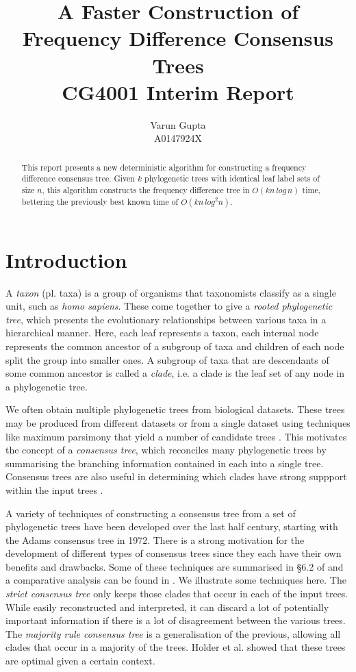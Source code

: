 \documentclass{article}
\title{A Faster Construction of Frequency Difference Consensus Trees\\CG4001 Interim Report}
\author{Varun Gupta\\A0147924X}
\begin{document}
    \maketitle

    \begin{abstract}
        This report presents a new deterministic algorithm for constructing a frequency difference consensus tree. Given $k$ phylogenetic trees with identical leaf label sets of size $n$, this algorithm constructs the frequency difference tree in $O(kn\,log\,n)$ time, bettering the previously best known time of $O(kn\,log^2n)$.
    \end{abstract}

    \section{Introduction}
    \label{sec:introduction}

    A \textit{taxon} (pl. taxa) is a group of organisms that taxonomists classify as a single unit, such as \textit{homo sapiens}. These come together to give a \textit{rooted phylogenetic tree}, which presents the evolutionary relationships between various taxa in a hierarchical manner. Here, each leaf represents a taxon, each internal node represents the common ancestor of a subgroup of taxa and children of each node split the group into smaller ones. A subgroup of taxa that are descendants of some common ancestor is called a \textit{clade}, i.e. a clade is the leaf set of any node in a phylogenetic tree.

    We often obtain multiple phylogenetic trees from biological datasets. These trees may be produced from different datasets or from a single dataset using techniques like maximum parsimony that yield a number of candidate trees \cite{bryant1997hunting}. This motivates the concept of a \textit{consensus tree}, which reconciles many phylogenetic trees by summarising the branching information contained in each into a single tree. Consensus trees are also useful in determining which clades have strong suppport within the input trees \cite{felsenstein2004inferring}.

    A variety of techniques of constructing a consensus tree from a set of phylogenetic trees have been developed over the last half century, starting with the Adams consensus tree \cite{adams1972consensus} in 1972. There is a strong motivation for the development of different types of consensus trees since they each have their own benefits and drawbacks. Some of these techniques are summarised in \S 6.2 of \cite{bryant1997hunting} and a comparative analysis can be found in \cite{bryant2003classification}. We illustrate some techniques here. The \textit{strict consensus tree} \cite{sokal1981taxonomic} only keeps those clades that occur in each of the input trees. While easily reconstructed and interpreted, it can discard a lot of potentially important information if there is a lot of disagreement between the various trees. The \textit{majority rule consensus tree} \cite{margush1981consensusn} is a generalisation of the previous, allowing all clades that occur in a majority of the trees. Holder et al. \cite{holder2008justification} showed that these trees are optimal given a certain context.
\end{document}
